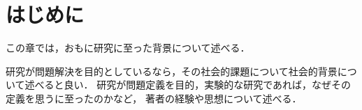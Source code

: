\chapter{はじめに}
\label{chap:introduction}

この章では，おもに研究に至った背景について述べる．


研究が問題解決を目的としているなら，その社会的課題について社会的背景について述べると良い．
研究が問題定義を目的，実験的な研究であれば，なぜその定義を思うに至ったのかなど，
著者の経験や思想について述べる．


